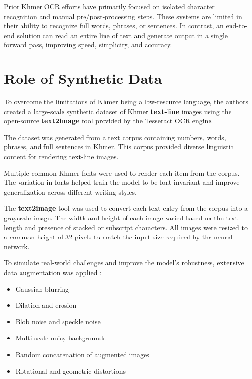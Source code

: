 Prior Khmer OCR efforts have primarily focused on isolated character recognition 
and manual pre/post-processing steps. These systems are limited in their ability to 
recognize full words, phrases, or sentences. In contrast, an end-to-end solution can 
read an entire line of text and generate output in a single forward pass, 
improving speed, simplicity, and accuracy. \cite{buoy2021seq2seq}



\section{Role of Synthetic Data}
\label{sec:dl-models}

To overcome the limitations of Khmer being a low-resource language, 
the authors created a large-scale synthetic dataset of Khmer \textbf{text-line} 
images using the open-source \textbf{text2image} tool provided by the Tesseract OCR engine.

The dataset was generated from a text corpus containing numbers, words, phrases, 
and full sentences in Khmer. \cite{buoy2021seq2seq} This corpus provided diverse linguistic content 
for rendering text-line images.

Multiple common Khmer fonts were used to render each item from the corpus. 
The variation in fonts helped train the model to be font-invariant and improve 
generalization across different writing styles.

The \textbf{text2image} tool was used to convert each text entry from the corpus into a 
grayscale image. The width and height of each image varied based on the text 
length and presence of stacked or subscript characters. All images were 
resized to a common height of 32 pixels to match the input size required 
by the neural network.

To simulate real-world challenges and improve the model's robustness, 
extensive data augmentation was applied \cite{buoy2021seq2seq} :
    \begin{itemize}
        \item Gaussian blurring
        \item Dilation and erosion
        \item Blob noise and speckle noise
        \item Multi-scale noisy backgrounds
        \item Random concatenation of augmented images
        \item Rotational and geometric distortions
    \end{itemize}

